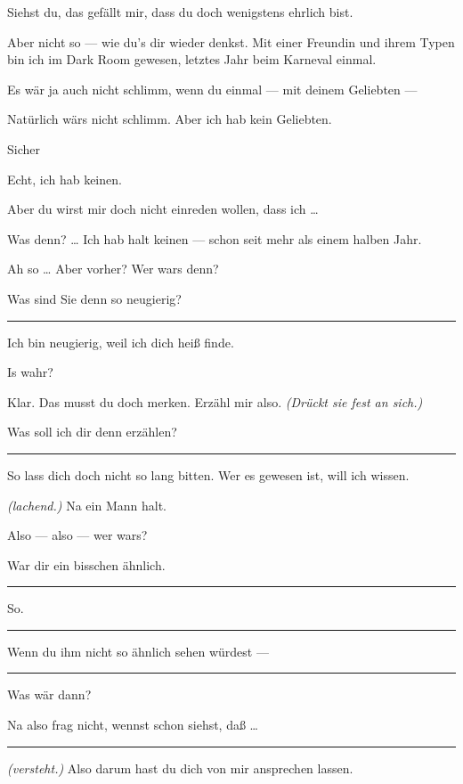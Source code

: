 \documentclass[
	final,
	a4paper,
	ngerman,
	mpinclude = true, %
	twoside = true,
	open = right,
	cleardoublepage = plain,
	DIV = 13,
	BCOR = 1cm,
	titlepage = firstiscover,
	]{scrbook}
\newcommand{\direction}[1]{\textit{(#1)}}
\newenvironment{deletion}{%
		\vspace{0.25\baselineskip}
		\hrule
		\vspace{0.25\baselineskip}
		\color{darkgray}
	}{
		\color{black}
		\vspace{0.25\baselineskip}
		\hrule 
		\vspace{0.25\baselineskip}
	}
\newcommand{\thecharacter}[1]{\textup{\textsc{#1}}\xspace}
\newcommand{\thegatte}{\thecharacter{Christian}}
\newcommand{\thesuesse}{\thecharacter{Lola}}
\newcommand{\character}[1]{\item[#1:]}
\newcommand{\gatte}{\character{\thegatte}}
\newcommand{\suesse}{\character{\thesuesse}}
\begin{document}
\begin{play}
	\gatte
	Siehst du, das gefällt mir, dass du doch wenigstens ehrlich bist.

	\suesse
	Aber nicht so --- wie du's dir wieder denkst. Mit einer Freundin und ihrem Typen bin ich im Dark Room gewesen, letztes Jahr beim Karneval einmal.

	\gatte
	Es wär ja auch nicht schlimm, wenn du einmal --- mit deinem Geliebten ---

	\suesse
	Natürlich wärs nicht schlimm. Aber ich hab kein Geliebten.

	\gatte
	Sicher

	\suesse
	Echt, ich hab keinen.

	\gatte
	Aber du wirst mir doch nicht einreden wollen, dass ich \ldots{}

	\suesse
	Was denn? \ldots{} Ich hab halt keinen --- schon seit mehr als einem halben Jahr.

	\gatte
	Ah so \ldots{} Aber vorher? Wer wars denn?

	\suesse
	Was sind Sie denn so neugierig?

	\begin{deletion}
	\gatte
	Ich bin neugierig, weil ich dich heiß finde.

	\suesse
	Is wahr?

	\gatte
	Klar. Das musst du doch merken. Erzähl mir also. \direction{Drückt sie fest an sich.}

	\suesse
	Was soll ich dir denn erzählen?
	\end{deletion}

	\gatte
	So lass dich doch nicht so lang bitten. Wer es gewesen ist, will ich wissen.

	\suesse
	\direction{lachend.} Na ein Mann halt.

	\gatte
	Also --- also --- wer wars?

	\suesse
	War dir ein bisschen ähnlich.
	\begin{deletion}

	\gatte
	So.

	\suesse
	\end{deletion}
	Wenn du ihm nicht so ähnlich sehen würdest ---

	\begin{deletion}
	\gatte
	Was wär dann?

	\suesse
	Na also frag nicht, wennst schon siehst, daß \ldots{}
	\end{deletion}

	\gatte
	\direction{versteht.} Also darum hast du dich von mir ansprechen lassen.


\end{play}
\end{document}
